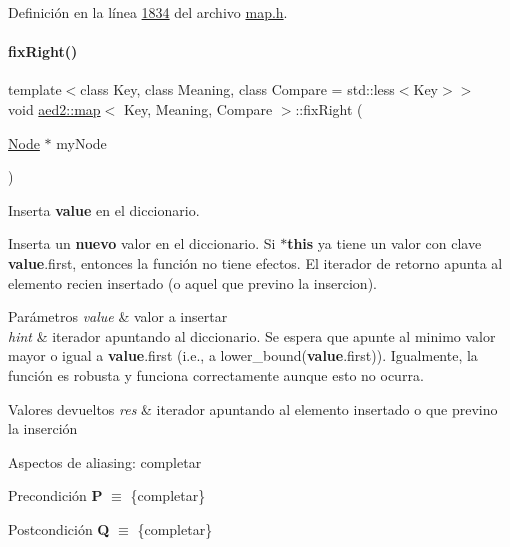 Definición en la línea \hyperlink{map_8h_source_l01834}{1834} del archivo \hyperlink{map_8h_source}{map.\+h}.

\mbox{\label{classaed2_1_1map_ae908761d06411046290cf49a5e0618bd_ae908761d06411046290cf49a5e0618bd}} 
\paragraph{\texorpdfstring{fix\+Right()}{fixRight()}}
{\footnotesize\ttfamily template$<$class Key, class Meaning, class Compare = std\+::less$<$\+Key$>$$>$ \\
void \hyperlink{classaed2_1_1map}{aed2\+::map}$<$ Key, Meaning, Compare $>$\+::fix\+Right (\begin{DoxyParamCaption}\item[{\hyperlink{structaed2_1_1map_1_1Node}{Node} $\ast$}]{my\+Node }\end{DoxyParamCaption})\hspace{0.3cm}{\ttfamily [inline]}}



Inserta {\bfseries value} en el diccionario. 

Inserta un {\bfseries nuevo} valor en el diccionario. Si {\bfseries $\ast$this} ya tiene un valor con clave {\bfseries value}.first, entonces la función no tiene efectos. El iterador de retorno apunta al elemento recien insertado (o aquel que previno la insercion).


\begin{DoxyParams}{Parámetros}
{\em value} & valor a insertar \\
\hline
{\em hint} & iterador apuntando al diccionario. Se espera que apunte al minimo valor mayor o igual a {\bfseries value}.first (i.\+e., a lower\+\_\+bound({\bfseries value}.first)). Igualmente, la función es robusta y funciona correctamente aunque esto no ocurra. \\
\hline
\end{DoxyParams}

\begin{DoxyRetVals}{Valores devueltos}
{\em res} & iterador apuntando al elemento insertado o que previno la inserción\\
\hline
\end{DoxyRetVals}
\begin{DoxyParagraph}{Aspectos de aliasing\+:}
completar
\end{DoxyParagraph}
\begin{DoxyPrecond}{Precondición}
{\bfseries P} $\equiv$ \{completar\} 
\end{DoxyPrecond}
\begin{DoxyPostcond}{Postcondición}
{\bfseries Q} $\equiv$ \{completar\}
\end{DoxyPostcond}

